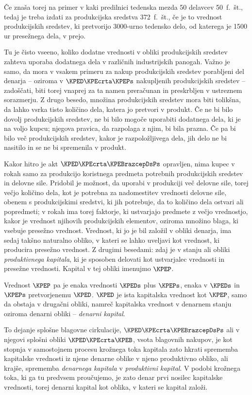 \documentclass[kapital_02.tex]{subfiles}
\begin{document}
Če znaša torej na primer v kaki predilnici tedenska mezda 50 delavcev 50\ f.\ št., tedaj je treba izdati za produkcijska sredstva 372\ f.\ št., če je to vrednost produkcijskih sredstev, ki pretvorijo 3000-urno tedensko delo, od katerega je 1500 ur presežnega dela, v prejo.

Tu je čisto vseeno, koliko dodatne vrednosti v obliki produkcijskih sredstev zahteva uporaba dodatnega dela v različnih industrijskih panogah. Važno je samo, da mora v \KPEstran vsakem primeru za nakup produkcijskih sredstev porabljeni del denarja -- oziroma v \(\KPED\KPEcrta\KPEPs\) nakupljenih produkcijskih sredstev -- zadoščati, biti torej vnaprej za ta namen preračunan in preskrbljen v ustreznem sorazmerju. Z drugo besedo, množina produkcijskih sredstev mora biti tolikšna, da lahko vsrka tisto količino dela, katera jo pretvori v produkt. Če ne bi bilo dovolj produkcijskih sredstev, ne bi bilo mogoče uporabiti dodatnega dela, ki je na voljo kupcu; njegova pravica, da razpolaga z njim, bi bila prazna. Če pa bi bilo več produkcijskih sredstev, kakor je razpoložljivega dela, jih delo ne bi nasitilo in se ne bi spremenila v produkt.

Kakor hitro je akt \(\KPED\KPEcrta\KPEBrazcepDsPs\) opravljen, nima kupec v rokah samo za produkcijo koristnega predmeta potrebnih produkcijskih sredstev in delovne sile. Pridobil je možnost, da uporabi v produkciji več delovne sile, torej večjo količino dela, kot je potrebna za nadomestitev vrednosti delovne sile, obenem s produkcijskimi sredstvi, ki jih potrebuje, da to količino dela ostvari ali popredmeti; v rokah ima torej faktorje, ki ustvarjajo predmete z večjo vrednostjo, kakor je vrednost njihovih produkcijskih elementov, oziroma množino blaga, ki vsebuje presežno vrednost. Vrednost, ki jo je bil založil v obliki denarja, ima sedaj takšno naturalno obliko, v kateri se lahko uveljavi kot vrednost, ki producira presežno vrednost. Z drugimi besedami: zdaj je v stanju ali obliki \emph{produktivnega kapitala}, ki je sposoben delovati kot ustvarjalec vrednosti in presežne vrednosti. Kapital v tej obliki imenujmo \(\KPEP\).

Vrednost \(\KPEP\) pa je enaka vrednosti \(\KPEDs\) plus \(\KPEPs\), enaka v \(\KPEDs\) in \(\KPEPs\) pretvorjenemu \(\KPED\). \(\KPED\) je ista kapitalska vrednost kot \(\KPEP\), samo da obstaja v drugačni obliki, namreč kapitalska vrednost v denarnem stanju oziroma denarni obliki -- \emph{denarni kapital}.

To dejanje splošne blagovne cirkulacije, \(\KPED\KPEcrta\KPEBrazcepDsPs\) ali v njegovi splošni obliki \(\KPED\KPEcrta\KPEB\), vsota blagovnih nakupov, je kot stopnja v samostojnem procesu krožnega toka kapitala \KPEstran zato hkrati sprememba kapitalske vrednosti iz njene denarne oblike v njeno produktivno obliko, ali krajše, sprememba \emph{denarnega kapitala} v \emph{produktivni kapital}. V podobi krožnega toka, ki ga tu predvsem proučujemo, je zato denar prvi nosilec kapitalske vrednosti, torej denarni kapital kot oblika, v kateri se kapital založi.
\end{document}
